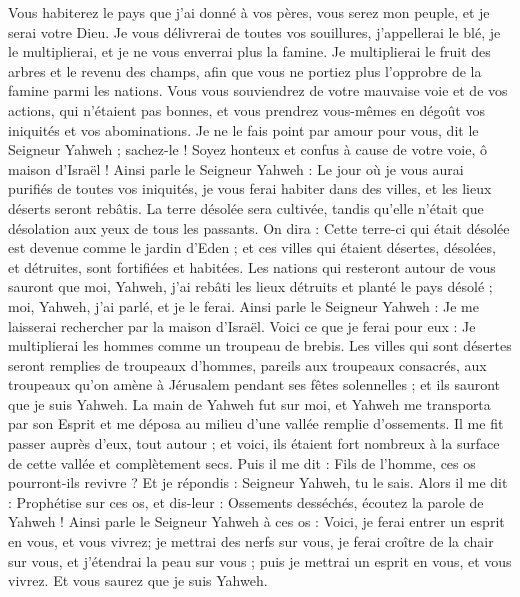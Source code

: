 \begin{multicols}{2}
Vous habiterez le pays que j'ai donné à vos pères, vous serez mon peuple, et je serai votre Dieu.
Je vous délivrerai de toutes vos souillures, j'appellerai le blé, je le multiplierai, et je ne vous enverrai plus la famine.
Je multiplierai le fruit des arbres et le revenu des champs, afin que vous ne portiez plus l'opprobre de la famine parmi les nations.
Vous vous souviendrez de votre mauvaise voie et de vos actions, qui n'étaient pas bonnes, et vous prendrez vous-mêmes en dégoût vos iniquités et vos abominations.
Je ne le fais point par amour pour vous, dit le Seigneur Yahweh ; sachez-le ! Soyez honteux et confus à cause de votre voie, ô maison d'Israël !
Ainsi parle le Seigneur Yahweh : Le jour où je vous aurai purifiés de toutes vos iniquités, je vous ferai habiter dans des villes, et les lieux déserts seront rebâtis.
La terre désolée sera cultivée, tandis qu’elle n’était que désolation aux yeux de tous les passants.
On dira : Cette terre-ci qui était désolée est devenue comme le jardin d'Eden ; et ces villes qui étaient désertes, désolées, et détruites, sont fortifiées et habitées.
Les nations qui resteront autour de vous sauront que moi, Yahweh, j'ai rebâti les lieux détruits et planté le pays désolé ; moi, Yahweh, j'ai parlé, et je le ferai.
Ainsi parle le Seigneur Yahweh : Je me laisserai rechercher par la maison d'Israël. Voici ce que je ferai pour eux : Je multiplierai les hommes comme un troupeau de brebis.
Les villes qui sont désertes seront remplies de troupeaux d'hommes, pareils aux troupeaux consacrés, aux troupeaux qu’on amène à Jérusalem pendant ses fêtes solennelles ; et ils sauront que je suis Yahweh.
\VerseOne{}La main de Yahweh fut sur moi, et Yahweh me transporta par son Esprit et me déposa au milieu d'une vallée remplie d'ossements.
Il me fit passer auprès d'eux, tout autour ; et voici, ils étaient fort nombreux à la surface de cette vallée et complètement secs.
Puis il me dit : Fils de l’homme, ces os pourront-ils revivre ? Et je répondis : Seigneur Yahweh, tu le sais.
Alors il me dit : Prophétise sur ces os, et dis-leur : Ossements desséchés, écoutez la parole de Yahweh !
Ainsi parle le Seigneur Yahweh à ces os : Voici, je ferai entrer un esprit en vous, et vous vivrez;
je mettrai des nerfs sur vous, je ferai croître de la chair sur vous, et j'étendrai la peau sur vous ; puis je mettrai un esprit en vous, et vous vivrez. Et vous saurez que je suis Yahweh.

\end{multicols}

